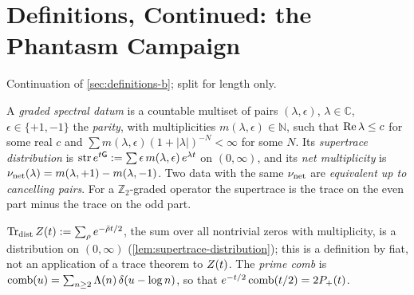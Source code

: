 
\section{Definitions, Continued: the Phantasm Campaign}
\label{sec:definitions-c}

Continuation of \cref{sec:definitions-b}; split for length only.

\begin{definition}
\label{def:graded-spectral-datum}
A \emph{graded spectral datum} is a countable multiset of pairs $(\lambda,\epsilon)$,
$\lambda\in\mathbb C$, $\epsilon\in\{+1,-1\}$ the \emph{parity}, with multiplicities
$m(\lambda,\epsilon)\in\mathbb N$, such that $\operatorname{Re}\lambda\le c$ for some real $c$ and
$\sum m(\lambda,\epsilon)(1+|\lambda|)^{-N}<\infty$ for some $N$. Its \emph{supertrace
distribution} is $\operatorname{str} e^{t\mathsf G} := \sum\epsilon\,m(\lambda,\epsilon)\,e^{\lambda t}$
on $(0,\infty)$, and its \emph{net multiplicity} is $\nu_{\mathrm{net}}(\lambda) = m(\lambda,+1) -
m(\lambda,-1)$. Two data with the same $\nu_{\mathrm{net}}$ are \emph{equivalent up to cancelling
pairs}. For a $\mathbb Z_2$-graded operator the supertrace is the trace on the even part
minus the trace on the odd part.
\end{definition}

\begin{definition}
\label{def:distributional-trace}
$\operatorname{Tr}_{\mathrm{dist}}Z(t) := \sum_{\rho}e^{-\bar{\rho}t/2}$, the sum over all nontrivial zeros with
multiplicity, is a distribution on $(0,\infty)$ (\cref{lem:supertrace-distribution}); this
is a definition by fiat, not an application of a trace theorem to $Z(t)$. The \emph{prime
comb} is $\operatorname{comb}(u) = \sum_{n\ge2}\Lambda(n)\,\delta(u-\log n)$, so that $e^{-t/2}\operatorname{comb}(t/2)
= 2P_{+}(t)$.
\end{definition}

